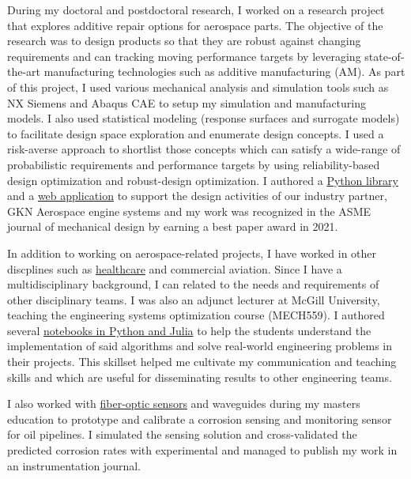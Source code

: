 \documentclass[12pt]{article} %
\begin{document}
During my doctoral and postdoctoral research, I worked on a research project that explores additive repair options for aerospace parts. The objective of the research was to design products so that they are robust against changing requirements and can tracking moving performance targets by leveraging state-of-the-art manufacturing technologies such as additive manufacturing (AM). As part of this project, I used various mechanical analysis and simulation tools such as NX Siemens and Abaqus CAE to setup my simulation and manufacturing models. I also used statistical modeling (response surfaces and surrogate models) to facilitate design space exploration and enumerate design concepts. I used a risk-averse approach to shortlist those concepts which can satisfy a wide-range of probabilistic requirements and performance targets by using reliability-based design optimization and robust-design optimization. I authored a \href{https://sed-group.github.io/mvmlib/index.html}{Python library} and a \href{https://github.com/khbalhandawi/scale_AM_webapp}{web application} to support the design activities of our industry partner, GKN Aerospace engine systems and my work was recognized in the ASME journal of mechanical design by earning a best paper award in 2021.

\medskip %

In addition to working on aerospace-related projects, I have worked in other discplines such as \href{https://github.com/khbalhandawi/COVID_SIM_GPU}{healthcare} and commercial aviation. Since I have a multidisciplinary background, I can related to the needs and requirements of other disciplinary teams. I was also an adjunct lecturer at McGill University, teaching the engineering systems optimization course (MECH559). I authored several \href{https://github.com/khbalhandawi/MECH559_notebooks}{notebooks in Python and Julia} to help the students understand the implementation of said algorithms and solve real-world engineering problems in their projects. This skillset helped me cultivate my communication and teaching skills and which are useful for disseminating results to other engineering teams.

\medskip %

I also worked with \href{https://khbalhandawi.github.io/projects/6_project/}{fiber-optic sensors} and waveguides during my masters education to prototype and calibrate a corrosion sensing and monitoring sensor for oil pipelines. I simulated the sensing solution and cross-validated the predicted corrosion rates with experimental and managed to publish my work in an instrumentation journal.
\end{document}
